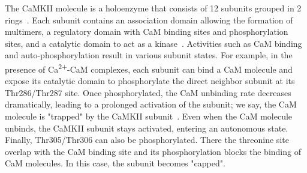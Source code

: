 \documentclass[10pt,letterpaper]{article}
\begin{document}
The CaMKII molecule is a holoenzyme that consists of 12 subunits grouped in 2 rings~\cite{Lisman:2002ki,Coultrap:2012ip,Stratton:2013el,Hell:2014bd}. Each subunit contains an association domain allowing the formation of multimers, a regulatory domain with CaM binding sites and phosphorylation sites, and a catalytic domain to act as a kinase~\cite{Lisman:2002ki,Coultrap:2012ip,Stratton:2013el,Hell:2014bd}. Activities such as CaM binding and auto-phosphorylation result in various subunit states. For example, in the presence of Ca\textsuperscript{2+}-CaM complexes, each subunit can bind a CaM molecule and expose its catalytic domain to phosphorylate the direct neighbor subunit at its Thr286/Thr287 site. Once phosphorylated, the CaM unbinding rate decreases dramatically, leading to a prolonged activation of the subunit; we say, the CaM molecule is "trapped" by the CaMKII subunit~\cite{Meyer:1992dp}. Even when the CaM molecule unbinds, the CaMKII subunit stays activated, entering an autonomous state. Finally, Thr305/Thr306 can also be phosphorylated. There the threonine site overlap with the CaM binding site and its phosphorylation blocks the binding of CaM molecules. In this case, the subunit becomes "capped". 
\end{document}
